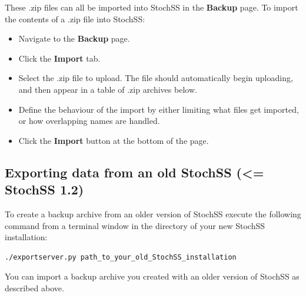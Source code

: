 These .zip files can all be imported into StochSS in the \textbf{Backup} page. To import the contents of a .zip file into StochSS:

\begin{itemize}
\item Navigate to the \textbf{Backup} page.
\item Click the \textbf{Import} tab.
\item Select the .zip file to upload. The file should automatically begin uploading, and then appear in a table of .zip archives below.
\item Define the behaviour of the import by either limiting what files get imported, or how overlapping names are handled.
\item Click the \textbf{Import} button at the bottom of the page.
\end{itemize}

\subsection{Exporting data from an old StochSS (<= StochSS 1.2)}
To create a backup archive from an older version of StochSS execute the following command from a terminal window in the directory of your new StochSS installation:
\begin{verbatim}
./exportserver.py path_to_your_old_StochSS_installation
\end{verbatim}
You can import a backup archive you created with an older version of StochSS as described above.

